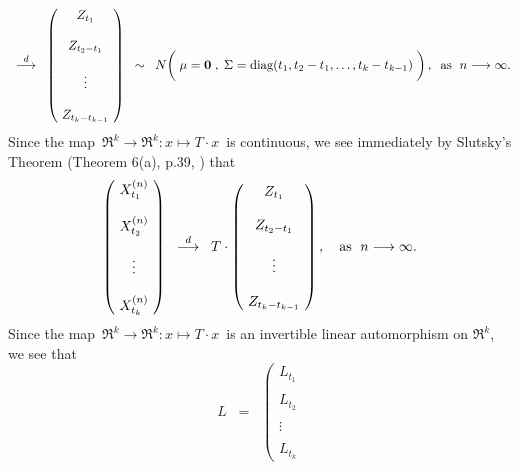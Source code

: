 \begin{enumerate}
\begin{equation*}
		\;\;\overset{d}{\longrightarrow}\;\;
		\left(\!
		\begin{array}{c}
		Z_{t_{1}} \\ \\ Z_{t_{2} - t_{1}} \\ \\ \vdots \\ \\ Z_{t_{k} - t_{k-1}}
		\end{array}
		\!\right)	
		\;\; \sim \;\;
		N\!\left(\;\mu = \mathbf{0}\;,\; \overset{{\color{white}1}}{\Sigma} = \diag(t_{1},t_{2}-t_{1},\ldots,t_{k}-t_{k-1})\;\right),
		\;\;\textnormal{as \;$n \longrightarrow\infty$}.
		\end{equation*}
		Since the map \,$\Re^{k} \longrightarrow \Re^{k} : x \longmapsto T\cdot x$\, is continuous,
		we see immediately by Slutsky's Theorem (Theorem 6(a), p.39, \cite{Ferguson1996}) that
		\begin{equation*}
		\left(\!
		\begin{array}{c}
		X^{(n)}_{t_{1}} \\ \\ X^{(n)}_{t_{2}} \\ \\ \vdots \\ \\ X^{(n)}_{t_{k}} 
		\end{array}
		\!\right)
		\;\;\overset{d}{\longrightarrow}\;\;
		T\cdot		
		\left(\!
		\begin{array}{c}
		Z_{t_{1}} \\ \\ Z_{t_{2} - t_{1}} \\ \\ \vdots \\ \\ Z_{t_{k} - t_{k-1}}
		\end{array}
		\!\right)	,
		\quad\textnormal{as \;$n \longrightarrow\infty$}.
		\end{equation*}
		Since the map \,$\Re^{k} \longrightarrow \Re^{k} : x \longmapsto T\cdot x$\,
		is an invertible linear automorphism on $\Re^{k}$, we see that
		\begin{equation*}
		L
		\;\; = \;\;
		\left(\!
		\begin{array}{c}
		L_{t_{1}} \\ \\ L_{t_{2}} \\ \\ \vdots \\ \\ L_{t_{k}}

\end{array}
\end{equation*}
\end{enumerate}
